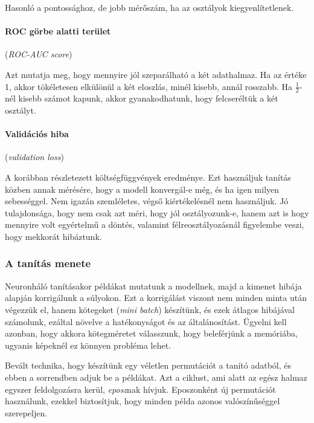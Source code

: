 \noindent
Hasonló a pontossághoz, de jobb mérőszám, ha az osztályok kiegyenlítetlenek.



\paragraph{ROC görbe alatti terület} (\textit{ROC-AUC score})

Azt mutatja meg, hogy mennyire jól szeparálható a két adathalmaz. 
Ha az értéke 1, akkor tökéletesen elkülönül a két eloszlás, 
minél kisebb, annál rosszabb. Ha $ \frac{1}{2} $-nél kisebb számot kapunk,
akkor gyanakodhatunk, hogy felcseréltük a két osztályt.

\paragraph{Validációs hiba} (\textit{validation loss})

A korábban részletezett költségfüggvények eredménye. Ezt használjuk
tanítás közben annak mérésére, hogy a modell konvergál-e még,
és ha igen milyen sebességgel. Nem igazán szemléletes, végső kiértékelésnél
nem használjuk. Jó tulajdonsága, hogy nem csak azt méri, hogy jól
osztályozunk-e, hanem azt is hogy mennyire volt egyértelmű a döntés,
valamint félreosztályozásnál figyelembe veszi, hogy mekkorát hibáztunk.



\subsubsection{A tanítás menete}

Neuronháló tanításakor példákat mutatunk a modellnek, majd a kimenet
hibája alapján korrigálunk a súlyokon. Ezt a korrigálást viszont nem
minden minta után végezzük el, hanem kötegeket (\textit{mini batch}) 
készítünk, és ezek átlagos hibájával számolunk, ezáltal 
növelve a hatékonyságot és az általánosítást. Ügyelni kell azonban, hogy
akkora kötegméretet válasszunk, hogy beleférjünk a memóriába, ugyanis 
képeknél ez könnyen probléma lehet.


Bevált technika, hogy készítünk egy véletlen permutációt a tanító adatból,
és ebben a sorrendben adjuk be a példákat. Azt a ciklust, ami alatt 
az egész halmaz egyszer feldolgozásra kerül, \textit{eposz}nak hívjuk.
Eposzonként új permutációt használunk, ezekkel biztosítjuk, hogy minden
példa azonos valószínűséggel szerepeljen.


